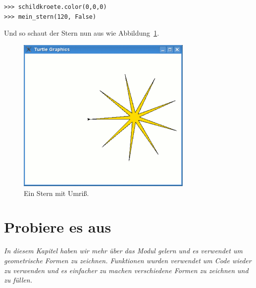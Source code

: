 \begin{Verbatim}[frame=single]
>>> schildkroete.color(0,0,0)
>>> mein_stern(120, False)
\end{Verbatim}

\noindent
Und so schaut der Stern nun aus wie Abbildung~\ref{fig30}.

\begin{figure}
\begin{center}
\includegraphics[width=85mm]{images/figure30}
\end{center}
\caption{Ein Stern mit Umriß.}\label{fig30}
\end{figure}

\section{Probiere es aus}

\emph{In diesem Kapitel haben wir mehr über das  Modul gelern und es verwendet um geometrische Formen zu zeichnen. Funktionen wurden verwendet um Code wieder zu verwenden und es einfacher zu machen verschiedene Formen zu zeichnen und zu füllen.}


